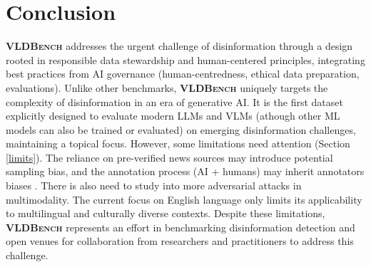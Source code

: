 \section{Conclusion}
\textsf{\textbf{\textsc{VLDBench}}} addresses the urgent challenge of disinformation through a design rooted in responsible data stewardship and human-centered principles, integrating best practices from AI governance (human-centredness, ethical data preparation, evaluations). Unlike other benchmarks, \textsf{\textbf{\textsc{VLDBench}}} uniquely targets the complexity of disinformation in an era of generative AI. It is the first dataset explicitly designed to evaluate modern LLMs and VLMs (athough other ML models can also be trained or evaluated) on emerging disinformation challenges, maintaining a topical focus.
However, some limitations need attention (Section \ref{limits}). The reliance on pre-verified news sources may introduce potential sampling bias, and the annotation process (AI + humans) may inherit annotators biases \cite{gilardi2023chatgpt}. There is also need to study into more adversarial attacks in multimodality. The current focus on English language only limits its applicability to multilingual and culturally diverse contexts. Despite these limitations, \textsf{\textbf{\textsc{VLDBench}}} represents an effort in benchmarking disinformation detection and open venues for collaboration from researchers and practitioners to address this challenge.

